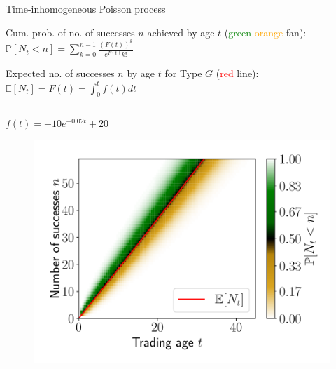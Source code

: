 \documentclass{beamer}
\begin{document}
\begin{frame}[allowframebreaks]{Time-inhomogeneous Poisson process}
\framebreak

Cum. prob. of no. of successes $n$ achieved by age $t$
(\textcolor{green}{green}-\textcolor{orange}{orange} fan):
$\mathbb{P}[N_t < n]
=  \sum_{k=0}^{n-1} \frac{\left(F(t)\right)^k}{e^{F(t)}k!}$

Expected no. of successes $n$ by age $t$ for Type $G$
(\textcolor{red}{red}
line):
$\mathbb{E}[N_{t}] = F(t)=\int_0^t f(t) dt$

	\begin{columns}[t]
		\begin{column}{0.49\textwidth}
			\begin{block}{$f(t)=-10e^{-0.02t}+20$}
				\begin{figure}
					\includegraphics[width=\linewidth]{figures/probn2}
				\end{figure}
			\end{block}
		\end{column}


\end{columns}
\end{frame}
\end{document}

